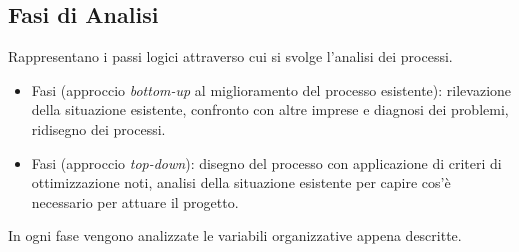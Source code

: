 \documentclass[a4paper, notitlepage, 9pt]{extreport}
\begin{document}
\subsection*{Fasi di Analisi}
Rappresentano i passi logici attraverso cui si svolge l’analisi dei processi.
\begin{itemize}
	\item Fasi (approccio \textit{bottom-up} al miglioramento del processo esistente): rilevazione della situazione esistente, confronto con altre imprese e diagnosi dei problemi, ridisegno dei processi.
	\item Fasi (approccio \textit{top-down}): disegno del processo con applicazione di criteri di ottimizzazione noti, analisi della situazione esistente per capire cos'è necessario per attuare il progetto.
\end{itemize}
In ogni fase vengono analizzate le variabili organizzative appena descritte.
\end{document}
